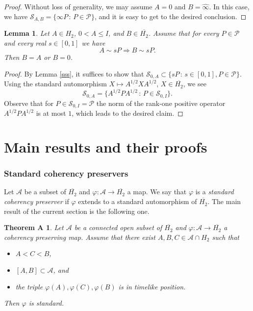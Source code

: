 \documentclass[10pt,a4paper]{amsart}
\providecommand{\index}[1]{}
\newcommand\oH{{\overline{H_2}}}
\newcommand\oi{{\widehat{\infty}}}
\newtheorem{lemma}[theorem]{Lemma}
\newtheorem*{theorema}{Theorem A}
\theoremstyle{definition}
\theoremstyle{remark}
\numberwithin{subsection}{section}
\numberwithin{equation}{section}
\begin{document}
\begin{proof}
Without loss of generality, we may assume $A=0$ and $B=\oi$. 
In this case, we have $\mathcal{S}_{A, B}=\{\infty P\,:\, P\in \mathcal{P}\}$, and it is easy to get to the desired conclusion.
\end{proof}


\begin{lemma}\label{smtr}
Let $A \in H_2$, $0 < A \le I$, and $B \in \oH$. Assume that for every $P \in \mathcal{P}$ and every real $s \in [0,1]$ we have
\[
A \sim sP \Rightarrow B \sim sP.
\]
Then $B=A$ or $B=0$.
\end{lemma}

\begin{proof}
By Lemma \ref{sss}, it suffices to show that $\mathcal{S}_{0, A}\subset \{sP\,:\, s\in [0,1], P\in \mathcal{P}\}$. 
Using the standard automorphism $X\mapsto A^{1/2} XA^{1/2}$, $X\in \oH$, we see
\[
\mathcal{S}_{0, A}= \{A^{1/2}PA^{1/2}\,:\, P\in \mathcal{S}_{0, I}\}.
\]
Observe that for $P\in \mathcal{S}_{0, I}=\mathcal{P}$ the norm of the rank-one positive operator $A^{1/2}PA^{1/2}$ is at most $1$,
which leads to the desired claim.
\end{proof}







\part{Main results and their proofs}

\section{Standard coherency preservers}\label{standard}
Let $\mathcal{A}$ be a subset of $\oH$ and $\varphi \colon \mathcal{A} \to \oH$ a map.  We say that $\varphi$ is a \emph{standard coherency preserver} \index{standard coherency preserver} if $\varphi$ extends to a standard automorphism of $\oH$. 
The main result of the current section is the following one.
\begin{theorema}\index{Theorem A}
Let $\mathcal{A}$ be a connected open subset of $\oH$ and $\varphi \colon \mathcal{A} \to \oH$ a coherency preserving map. Assume that there exist $A,B,C \in \mathcal{A}\cap H_2$ such that 
\begin{itemize}
\item $A <C< B$,
\item $[A,B] \subset \mathcal{A}$, and 
\item the triple $\varphi (A), \varphi (C) , \varphi (B)$ is in timelike position.
\end{itemize}
Then $\varphi$ is standard.
\end{theorema}
\end{document}
